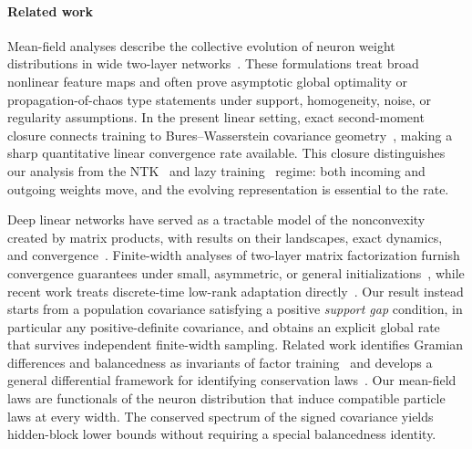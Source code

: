 \paragraph{Related work}
Mean-field analyses describe the collective evolution of neuron weight
distributions in wide two-layer networks~\citep{ChizatBach2018,MeiMontanariNguyen2018,RotskoffVandenEijnden2018}.
These formulations treat broad nonlinear feature maps and often prove asymptotic global optimality or propagation-of-chaos type statements under support, homogeneity, noise, or regularity assumptions.
In the present linear setting, exact second-moment closure connects
training to Bures--Wasserstein covariance geometry~\citep{Takatsu2011,BhatiaJainLim2019},
making a sharp quantitative linear convergence rate available.
This closure distinguishes our analysis from the NTK~\citep{JacotGabrielHongler2018} and lazy training~\citep{ChizatOyallonBach2019} regime: both incoming and outgoing weights move, and the evolving representation is essential to the rate.

Deep linear networks have served as a tractable model of the nonconvexity created by matrix products, with results on their landscapes, exact dynamics,
and convergence~\citep{SaxeMcClellandGanguli2014,Kawaguchi2016,LaurentVonBrecht2018,AroraCohenGolowichHu2019}.
Finite-width analyses of two-layer matrix factorization furnish convergence guarantees under small, asymmetric, or general initializations~\citep{YeDu2021,XuMinTarmounMalladaVidal2023}, while recent work treats discrete-time low-rank adaptation directly~\citep{MuKlabjan2025}.
Our result instead starts from a population covariance satisfying a positive \emph{support gap} condition, in particular any positive-definite covariance, and obtains an explicit global rate that survives independent finite-width sampling.
Related work identifies Gramian differences and balancedness as invariants of factor training~\citep{DuHuLee2018,TarmounFrancaHaeffeleVidal2021} and develops
a general differential framework for identifying conservation laws~\citep{MarcotteGribonvalPeyre2023}.
Our mean-field laws are functionals of the neuron distribution that induce
compatible particle laws at every width. The conserved spectrum of the
signed covariance yields hidden-block lower bounds without requiring
a special balancedness identity.

